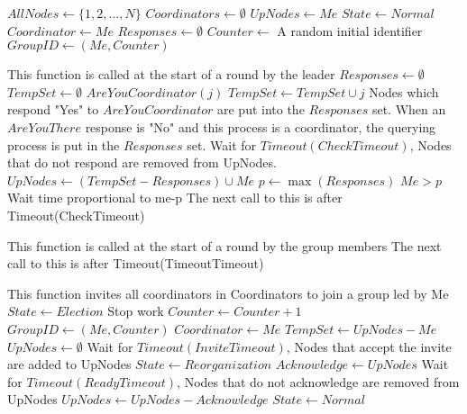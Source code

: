 \begin{algorithmic}

\State $AllNodes \gets \{ 1, 2, ..., N \}$
\State $Coordinators \gets \emptyset$
\State $UpNodes \gets { Me }$
\State $State \gets Normal$
\State $Coordinator \gets Me$
\State $Responses \gets \emptyset$
\State $Counter \gets$ A random initial identifier
\State $GroupID \gets (Me,Counter)$

\State

    \State This function is called at the start of a round by the leader
        \State $Responses \gets \emptyset$
        \State $TempSet \gets \emptyset$
            \State $AreYouCoordinator(j)$
            \State $TempSet \gets TempSet \cup j$
        \EndFor
        \State Nodes which respond "Yes" to $AreYouCoordinator$ are put into the $Responses$ set.
        \State When an $AreYouThere$ response is "No" and this process is a coordinator, the querying process is put in the $Responses$ set.
        \State Wait for $Timeout(CheckTimeout)$, Nodes that do not respond are removed from UpNodes.
        \State $UpNodes \gets (TempSet-Responses) \cup {Me}$
            \Return
        \EndIf
        \State $p \gets \max(Responses)$
        \If $Me > p$
            \State Wait time proportional to me-p
        \EndIf
    \EndIf
    \State The next call to this is after Timeout(CheckTimeout)
\EndFunction

\State

    \State This function is called at the start of a round by the group members
        \Return
    \Else
        \EndIf
    \EndIf
    \State The next call to this is after Timeout(TimeoutTimeout)
\EndFunction

\State

    \State This function invites all coordinators in Coordinators to join a group led by Me
    \State $State \gets Election$
    \State Stop work
    \State $Counter \gets Counter+1$
    \State $GroupID \gets (Me,Counter)$
    \State $Coordinator \gets Me$
    \State $TempSet \gets UpNodes - {Me}$
    \State $UpNodes \gets \emptyset$
    \EndFor
    \EndFor
    \State Wait for $Timeout(InviteTimeout)$, Nodes that accept the invite are added to UpNodes
    \State $State \gets Reorganization$
    \EndFor
    \State $Acknowledge \gets UpNodes$
    \State Wait for $Timeout(ReadyTimeout)$, Nodes that do not acknowledge are removed from UpNodes
    \State $UpNodes \gets UpNodes - Acknowledge$
    \State $State \gets Normal$
\EndFunction


\end{algorithmic}
